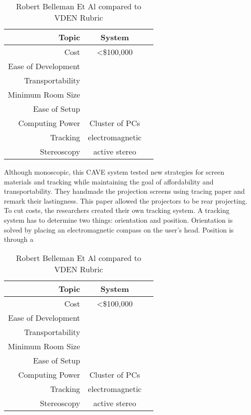 \begin{table}[H]
	\centering
	\renewcommand\arraystretch{0.5}
	\begin{tabular}{r|c|c}
		\hline 
		Topic & System &  \\ 
		\hline 
		Cost 				& \textless \$100,000 	& \cross \\ 
		Ease of Development & \ns 					& \cross \\ 
		Transportability 	& \ns  					& \cross \\ 
		Minimum Room Size 	& \ns 					& \cross \\ 
		Ease of Setup 		& \ns 					& \cross \\ 
		Computing Power 	& Cluster of PCs 		& \cross \\ 
		Tracking 			& electromagnetic 		& \cross \\ 
		Stereoscopy 		& active stereo 		& \checkmark \\
		\hline
	\end{tabular} 
	
	\caption{Robert Belleman Et Al compared to VDEN Rubric} \label{tab:stifdsamuli}
\end{table}

Although monoscopic, this CAVE system tested new strategies for screen materials and tracking while maintaining the goal of affordability and transportability. They handmade the projection screens using tracing paper and remark their lastingness. This paper allowed the projectors to be rear projecting. To cut costs, the researchers created their own tracking system. A tracking system has to determine two things: orientation and position. Orientation is solved by placing an electromagnetic compass on the user's head. Position is through a 



\filbreak
{}

\begin{table}[H]
	\centering
	\renewcommand\arraystretch{0.5}
	\begin{tabular}{r|c|c}
		\hline 
		Topic & System &  \\ 
		\hline 
		Cost 				& \textless \$100,000 	& \cross \\ 
		Ease of Development & \ns 					& \cross \\ 
		Transportability 	& \ns  					& \cross \\ 
		Minimum Room Size 	& \ns 					& \cross \\ 
		Ease of Setup 		& \ns 					& \cross \\ 
		Computing Power 	& Cluster of PCs 		& \cross \\ 
		Tracking 			& electromagnetic 		& \cross \\ 
		Stereoscopy 		& active stereo 		& \checkmark \\
		\hline 
	\end{tabular} 
	
	\caption{Robert Belleman Et Al compared to VDEN Rubric} \label{tab:stifdsamuli}
\end{table}

